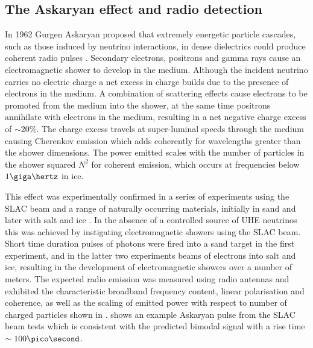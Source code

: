 \subsection{The Askaryan effect and radio detection}
\label{sec:uhe-app:UHEN:Askaryan}

In 1962 Gurgen Askaryan proposed that extremely energetic particle cascades, such as those induced by neutrino interactions, in dense dielectrics could produce coherent radio pulses \cite{Askaryan1965} \cite{Askaryan1962}. Secondary electrons, positrons and gamma rays cause an electromagnetic shower to develop in the medium. Although the incident neutrino carries no electric charge a net excess in charge builds due to the presence of electrons in the medium. A combination of scattering effects cause electrons to be promoted from the medium into the shower, at the same time positrons annihilate with electrons in the medium, resulting in a net negative charge excess of $\sim 20\%$. The charge excess travels at super-luminal speeds through the medium causing Cherenkov emission which adds coherently for wavelengths greater than the shower dimensions. The power emitted scales with the number of particles in the shower squared $N^{2}$ for coherent emission, which occurs at frequencies below $1\giga \hertz$ in ice. 

This effect was experimentally confirmed in a series of experiments using the SLAC beam and a range of naturally occurring materials, initially in sand \cite{PhysRevLett.86.2802} and later with salt \cite{PhysRevD.72.023002} and ice \cite{PhysRevLett.99.171101}. In the absence of a controlled source of UHE neutrinos this was achieved by instigating electromagnetic showers using the SLAC beam. Short time duration pulses of \GeV photons were fired into a sand target in the first experiment, and in the latter two experiments beams of electrons into salt and ice, resulting in the development of electromagnetic showers over a number of meters. The expected radio emission was measured using radio antennas and exhibited the characteristic broadband frequency content, linear polarisation and coherence, as well as the scaling of emitted power with respect to number of charged particles  shown in .  shows an example Askaryan pulse from the SLAC beam tests \cite{PhysRevD.72.023002} which is consistent with the predicted bimodal signal with a rise time $\sim 100 \pico \second$. 


